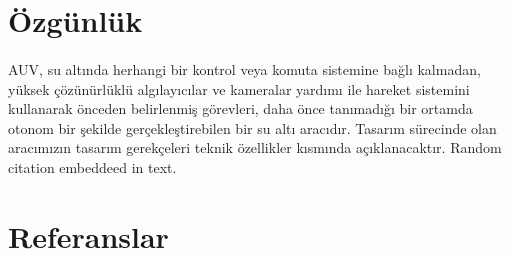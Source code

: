 \documentclass[12pt]{article}
\begin{document}
\section{Özgünlük}


\paragraph{} AUV, su altında herhangi bir kontrol veya komuta sistemine bağlı kalmadan, yüksek çözünürlüklü algılayıcılar ve kameralar yardımı ile hareket sistemini kullanarak önceden belirlenmiş görevleri, daha önce tanımadığı bir ortamda otonom bir şekilde gerçekleştirebilen bir su altı aracıdır. Tasarım sürecinde olan aracımızın tasarım gerekçeleri teknik özellikler kısmında açıklanacaktır. Random citation \cite{BOOK:o-ring} embeddeed in text.

\section{Referanslar}

\printbibliography[title={}]
\end{document}
